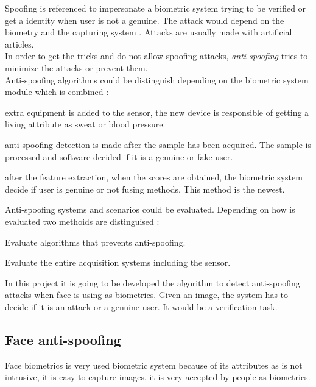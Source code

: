 Spoofing is referenced to impersonate a biometric system trying to be verified or get a identity when user is not a genuine. The attack would depend on the biometry and the capturing system \cite{Spoofing_survey}. Attacks are usually made with artificial articles.\\

In order to get the tricks and do not allow spoofing attacks, \textit{anti-spoofing} tries to minimize the attacks or prevent them.\\

Anti-spoofing algorithms could be distinguish depending on the biometric system module which is combined \cite{Spoofing_survey}:
\begin{description}[noitemsep,topsep=8pt,parsep=0pt,partopsep=20pt]
\item[Sensor level:] extra equipment is added to the sensor, the new device is responsible of getting a living attribute as sweat or blood pressure. 
\item[Feature level:] anti-spoofing detection is made after the sample has been acquired. The sample is processed and software decided if it is a genuine or fake user.
\item[Score level:] after the feature extraction, when the scores are obtained, the biometric system decide if user is genuine or not fusing methods. This method is the newest.
\end{description}


Anti-spoofing systems and scenarios could be evaluated. Depending on how is evaluated two methoids are distinguised \cite{Spoofing_survey}:
\begin{description}[noitemsep,topsep=8pt,parsep=0pt,partopsep=20pt]
\item[Algorithm-based or technology evaluation:] Evaluate algorithms that prevents anti-spoofing.
\item[System-based or scenario evaluation:] Evaluate the entire acquisition systems including the sensor.
\end{description}

In this project it is going to be developed the algorithm to detect anti-spoofing attacks when face is using as biometrics. Given an image, the system has to decide if it is an attack or a genuine user. It would be a verification task.\\

\subsection{Face anti-spoofing}
Face biometrics is very used biometric system because of its attributes as is not intrusive, it is easy to capture images, it is very accepted by people as biometrics. \\

